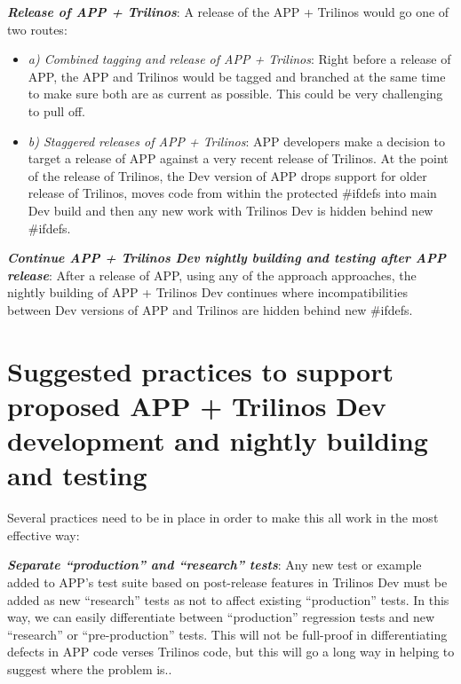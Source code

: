 \documentclass[pdf,ps2pdf,11pt]{SANDreport}
\begin{document}
{}\textit{\textbf{Release of APP + Trilinos}}: A release of the APP + Trilinos
would go one of two routes:

    \begin{itemize}

    {}\item\textit{a) Combined tagging and release of APP + Trilinos}: Right
    before a release of APP, the APP and Trilinos would be tagged and branched
    at the same time to make sure both are as current as possible.  This could
    be very challenging to pull off.

    {}\item\textit{b) Staggered releases of APP + Trilinos}: APP developers
    make a decision to target a release of APP against a very recent release
    of Trilinos.  At the point of the release of Trilinos, the Dev version of
    APP drops support for older release of Trilinos, moves code from within
    the protected {}\#ifdefs into main Dev build and then any new work with
    Trilinos Dev is hidden behind new {}\#ifdefs.

    \end{itemize}

{}\textit{\textbf{Continue APP + Trilinos Dev nightly building and testing after
APP release}}: After a release of APP, using any of the approach approaches,
the nightly building of APP + Trilinos Dev continues where incompatibilities
between Dev versions of APP and Trilinos are hidden behind new {}\#ifdefs.


%
{}\section{Suggested practices to support proposed APP + Trilinos Dev
development and nightly building and testing}
%

Several practices need to be in place in order to make this all work in the
most effective way:

{}\textit{\textbf{Separate ``production'' and ``research'' tests}}: Any new
test or example added to APP's test suite based on post-release features in
Trilinos Dev must be added as new ``research'' tests as not to affect existing
``production'' tests.  In this way, we can easily differentiate between
``production'' regression tests and new ``research'' or ``pre-production'' tests.
This will not be full-proof in differentiating defects in APP code verses
Trilinos code, but this will go a long way in helping to suggest where the
problem is..
\end{document}
